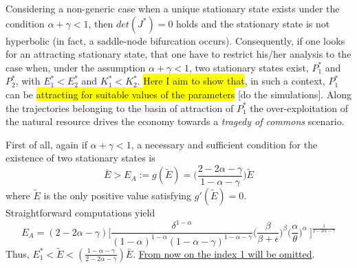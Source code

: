 Considering a non-generic case when a unique stationary state exists under the condition $\alpha+\gamma<1$, then $det(J^*)=0$ holds and the stationary state is not hyperbolic (in fact, a saddle-node bifurcation occurs). Consequently, if one looks for an attracting stationary state, that one have to restrict his/her analysis to the case when, under the assumption $\alpha+\gamma<1$, two stationary states exist, $P_1^*$ and $P_2^*$, with $E_1^* < E_2^*$ and $K_1^* < K_2^*$. \colorbox{yellow}{Here I aim to show that}, in such a context, $P_1^*$ can be \colorbox{yellow}{attracting for suitable values of the parameters} [do the simulations]. Along the trajectories belonging to the basin of attraction of $P_1^*$ the over-exploitation of the natural resource drives the economy towards a \textit{tragedy of commons} scenario.

First of all, again if $\alpha+\gamma<1$, a necessary and sufficient condition for the existence of two stationary states is
\begin{equation}
	\bar{E}>E_A := g(\tilde{E})=\Bigg(\frac{2-2\alpha-\gamma}{1-\alpha-\gamma}\Bigg) \tilde{E}
\end{equation}
where $\tilde{E}$ is the only positive value satisfying $g'(\tilde{E})=0$. \\
Straightforward computations yield 
\begin{equation} \label{eqn:E_A}
	E_A =(2-2\alpha-\gamma)\Bigg[\frac{\delta^{1-\alpha}}{(1-\alpha)^{1-\alpha}(1-\alpha-\gamma)^{1-\alpha-\gamma}} \Bigg(\frac{\beta}{\beta+\epsilon}\Bigg)^{\beta} \Bigg(\frac{\alpha}{\theta}\Bigg)^{\alpha}\ \Bigg]^{\frac{1}{2-2\alpha-\gamma}}
\end{equation}
Thus, $E_1^*<\tilde{E}<(\frac{1-\alpha-\gamma}{2-2\alpha-\gamma})\bar{E}$.
\underline{From now on the index 1 will be omitted}. 


